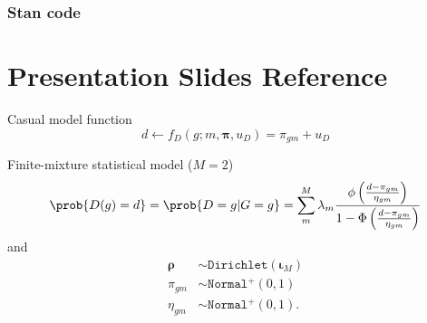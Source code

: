 \documentclass{article}
\begin{document}
\subsubsection*{Stan code}


\section*{Presentation Slides Reference}
 Casual model function 
 \begin{equation*}  
   d \leftarrow f_D(g; m, \boldsymbol{\pi}, u_D) = \pi_{gm} + u_D 
 \end{equation*} 


 Finite-mixture statistical model ($M = 2$) 
 \begin{align*} 
 \prob{D(g) = d} = \prob{D = g | G = g} = \sum_m^M \lambda_m \frac{\phi\left(\frac{d - \pi_{gm}}{\eta_{gm}}\right)}{1 - \Phi\left(\frac{d - \pi_{gm}}{\eta_{gm}}\right)}  
 \end{align*} 
 and 
 \begin{align*} 
   \boldsymbol{\rho} &\sim \mathtt{Dirichlet}(\boldsymbol{\iota}_M) \\ 
   \pi_{gm} &\sim \mathtt{Normal^+}(0, 1) \\ 
   \eta_{gm} &\sim \mathtt{Normal^+}(0, 1). 
 \end{align*} 
\end{document}
